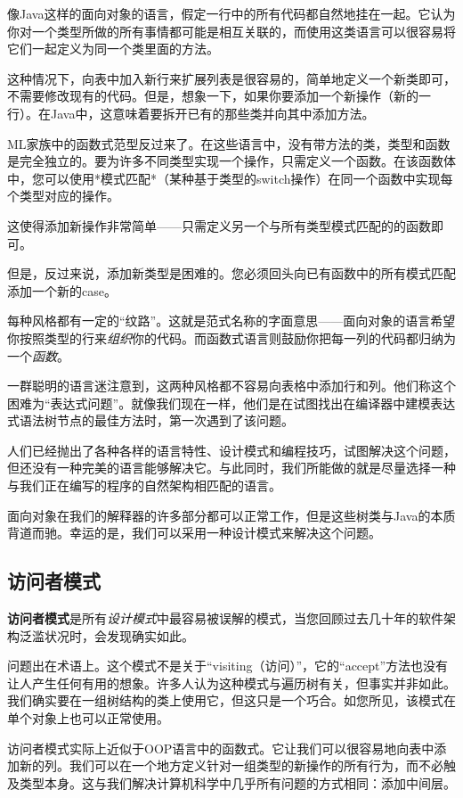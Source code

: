 \documentclass[cn,11pt,chinese]{elegantbook}
\begin{document}
像Java这样的面向对象的语言，假定一行中的所有代码都自然地挂在一起。它认为你对一个类型所做的所有事情都可能是相互关联的，而使用这类语言可以很容易将它们一起定义为同一个类里面的方法。

这种情况下，向表中加入新行来扩展列表是很容易的，简单地定义一个新类即可，不需要修改现有的代码。但是，想象一下，如果你要添加一个新操作（新的一行）。在Java中，这意味着要拆开已有的那些类并向其中添加方法。

ML家族中的函数式范型反过来了。在这些语言中，没有带方法的类，类型和函数是完全独立的。要为许多不同类型实现一个操作，只需定义一个函数。在该函数体中，您可以使用*模式匹配*（某种基于类型的switch操作）在同一个函数中实现每个类型对应的操作。

这使得添加新操作非常简单——只需定义另一个与所有类型模式匹配的的函数即可。

但是，反过来说，添加新类型是困难的。您必须回头向已有函数中的所有模式匹配添加一个新的case。

每种风格都有一定的“纹路”。这就是范式名称的字面意思——面向对象的语言希望你按照类型的行来\textit{组织}你的代码。而函数式语言则鼓励你把每一列的代码都归纳为一个\textit{函数}。

一群聪明的语言迷注意到，这两种风格都不容易向表格中添加行和列。他们称这个困难为“表达式问题”。就像我们现在一样，他们是在试图找出在编译器中建模表达式语法树节点的最佳方法时，第一次遇到了该问题。

人们已经抛出了各种各样的语言特性、设计模式和编程技巧，试图解决这个问题，但还没有一种完美的语言能够解决它。与此同时，我们所能做的就是尽量选择一种与我们正在编写的程序的自然架构相匹配的语言。

面向对象在我们的解释器的许多部分都可以正常工作，但是这些树类与Java的本质背道而驰。幸运的是，我们可以采用一种设计模式来解决这个问题。

\subsection{访问者模式}

\textbf{访问者模式}是所有\textit{设计模式}中最容易被误解的模式，当您回顾过去几十年的软件架构泛滥状况时，会发现确实如此。

问题出在术语上。这个模式不是关于“visiting（访问）”，它的“accept”方法也没有让人产生任何有用的想象。许多人认为这种模式与遍历树有关，但事实并非如此。我们确实要在一组树结构的类上使用它，但这只是一个巧合。如您所见，该模式在单个对象上也可以正常使用。

访问者模式实际上近似于OOP语言中的函数式。它让我们可以很容易地向表中添加新的列。我们可以在一个地方定义针对一组类型的新操作的所有行为，而不必触及类型本身。这与我们解决计算机科学中几乎所有问题的方式相同：添加中间层。
\end{document}
